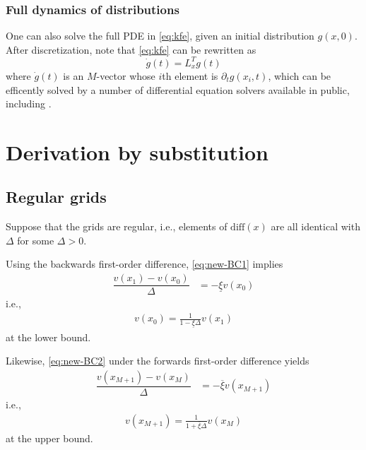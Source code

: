 \documentclass[11pt]{article}
\theoremstyle{definition}
\begin{document}
\subsubsection{Full dynamics of distributions}
One can also solve the full PDE in \eqref{eq:kfe}, given an initial distribution $g(x, 0)$. After discretization, note that \eqref{eq:kfe} can be rewritten as
\begin{equation}\label{eq:kfe-discretized}
\dot{g}(t) = L^T_x g(t)
\end{equation}
where $\dot{g}(t)$ is an $M$-vector whose $i$th element is $\partial_{t} g(x_i, t)$, which can be efficently solved by a number of differential equation solvers available in public, including \cite{rackauckas17}.

\newpage

\appendix
\section{Derivation by substitution}
\subsection{Regular grids}
Suppose that the grids are regular, i.e., elements of $\text{diff}(x)$ are all identical with $\Delta$ for some $\Delta > 0$.

Using the backwards first-order difference, \eqref{eq:new-BC1} implies
\begin{align}
\dfrac{v({x_{1}}) - v(x_{0})}{\Delta} &= - \underline{\xi} v({x_{0}})
\end{align}
i.e.,
\begin{align}\label{eq:BC1-extrapolation-uniform}
v(x_0) = \frac{1}{1-\underline{\xi} \Delta } v(x_1)
\end{align}
at the lower bound.

Likewise, \eqref{eq:new-BC2} under the forwards first-order difference yields
\begin{align}
\dfrac{v(x_{M+1}) - v({x_{M}})}{\Delta} &= - \overline{\xi} v({x_{M+1} })
\end{align}
i.e.,
\begin{align}\label{eq:BC2-extrapolation-uniform}
v(x_{M+1}) = \frac{1}{1+\overline{\xi} \Delta } v(x_M)
\end{align}
at the upper bound.
\end{document}
